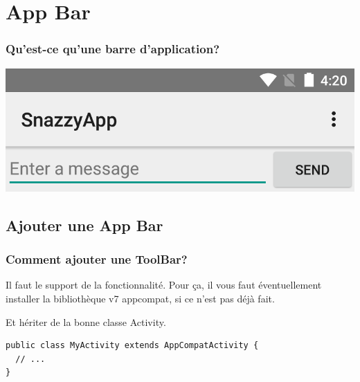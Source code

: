 \documentclass{beamer}
\begin{document}
\section{App Bar}

\begin{frame}
\frametitle{Qu'est-ce qu'une barre d'application?}

  \begin{center}
  \includegraphics[scale=0.4]{appbar_basic.png}
  \end{center}
\end{frame}

\subsection{Ajouter une App Bar}


\begin{frame}[fragile]
\frametitle{Comment ajouter une ToolBar?}

\begin{block}{Il faut le support de la fonctionnalité.}
Pour ça, il vous faut éventuellement installer la bibliothèque v7 appcompat, si ce n'est pas déjà fait.
\end{block}
\pause
\begin{block}{Et hériter de la bonne classe Activity.}
\begin{lstlisting}
public class MyActivity extends AppCompatActivity {
  // ...
}
\end{lstlisting}

\end{block}
\end{frame}
\end{document}
